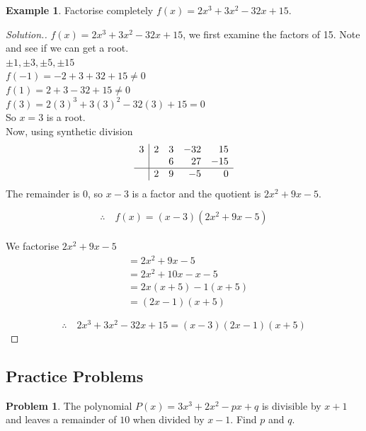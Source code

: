 \documentclass[11pt,a4paper]{article}
\theoremstyle{definition}
\newtheorem{example}[thm]{Example}
\newtheorem{problemx}{Problem}[section]
\newenvironment{problem}{\begin{problemx}}{\end{problemx}}
\newenvironment{solution}
  {\renewcommand{\qedsymbol}{}\begin{proof}[\textit{Solution}.]}
  {\end{proof}}
\begin{document}
\begin{example}

Factorise completely $f(x)=2x^3+3x^2-32x+15$.
\end{example}
\begin{solution}

$f(x)=2x^3+3x^2-32x+15$, we first examine the factors of 15. Note and see if we can get a root.\\

$\pm 1, \pm 3, \pm 5, \pm 15$\\

$f(-1)=-2+3+32+15\neq 0$\\

$f(1) =2+3-32+15\neq 0$\\

$f(3) = 2(3)^3+3(3)^2-32(3)+15=0$\\

So $x=3$ is a root.\\

Now, using synthetic division
$$\begin{array}{r|rrrr}
3 & 2 & 3 & -32 & 15\\
  &   & 6 & 27 & -15\\
\hline
  & 2 & 9 & -5 & 0
\end{array}$$
The remainder is $0$, so $x-3$ is a factor and the quotient is
$2x^{2}+9x-5$.

$$\therefore \quad  f(x)=(x-3)(2x^2+9x-5)$$\\

We factorise $2x^2+9x-5$
\begin{align*}
& = 2x^2+9x-5\\
& = 2x^2+10x-x-5\\
& = 2x(x+5)-1(x+5)\\
& = (2x-1)(x+5)
\end{align*}

$$\therefore\quad  2x^3+3x^2-32x+15=(x-3)(2x-1)(x+5)$$
\end{solution}
\pagebreak
\subsection{Practice Problems}

\begin{problem}
The polynomial $P(x)=3x^{3}+2x^{2}-px+q$ is divisible by $x+1$ and leaves a
remainder of $10$ when divided by $x-1$. Find $p$ and $q$.
\end{problem}
\end{document}
